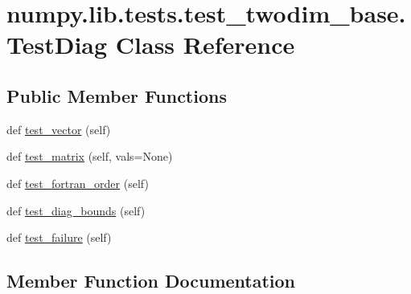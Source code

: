 \hypertarget{classnumpy_1_1lib_1_1tests_1_1test__twodim__base_1_1TestDiag}{}\section{numpy.\+lib.\+tests.\+test\+\_\+twodim\+\_\+base.\+Test\+Diag Class Reference}
\label{classnumpy_1_1lib_1_1tests_1_1test__twodim__base_1_1TestDiag}
\subsection*{Public Member Functions}
\begin{DoxyCompactItemize}
\item 
def \hyperlink{classnumpy_1_1lib_1_1tests_1_1test__twodim__base_1_1TestDiag_af83bb8ecfae46e9dd564756459a04a89}{test\+\_\+vector} (self)
\item 
def \hyperlink{classnumpy_1_1lib_1_1tests_1_1test__twodim__base_1_1TestDiag_ad3d41cfaf71b6fa15fdc6938bac98c56}{test\+\_\+matrix} (self, vals=None)
\item 
def \hyperlink{classnumpy_1_1lib_1_1tests_1_1test__twodim__base_1_1TestDiag_accb3ed510bd6574a8d2a68a12100a9a9}{test\+\_\+fortran\+\_\+order} (self)
\item 
def \hyperlink{classnumpy_1_1lib_1_1tests_1_1test__twodim__base_1_1TestDiag_a2bc38dfec7586c305659928bb513829e}{test\+\_\+diag\+\_\+bounds} (self)
\item 
def \hyperlink{classnumpy_1_1lib_1_1tests_1_1test__twodim__base_1_1TestDiag_a433994db0a14a6895ae111bed9e93606}{test\+\_\+failure} (self)
\end{DoxyCompactItemize}


\subsection{Member Function Documentation}
\mbox{\label{classnumpy_1_1lib_1_1tests_1_1test__twodim__base_1_1TestDiag_a2bc38dfec7586c305659928bb513829e}} 
